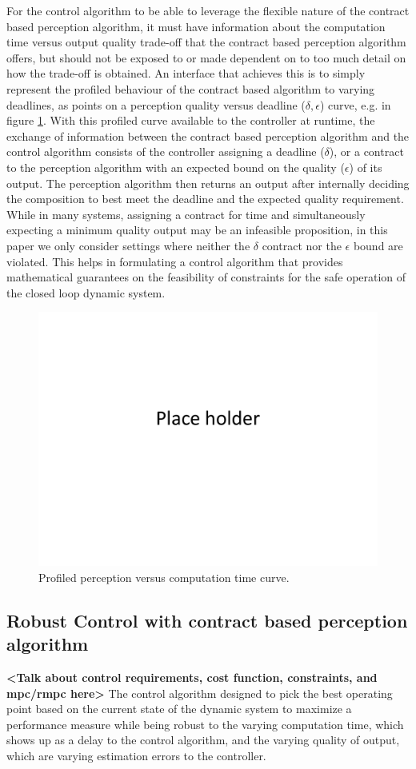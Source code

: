 For the control algorithm to be able to leverage the flexible nature of the contract based perception algorithm, it must have information about the computation time versus output quality trade-off that the contract based perception algorithm offers, but should not be exposed to or made dependent on to too much detail on how the trade-off is obtained. An interface that achieves this is to simply represent the profiled behaviour of the contract based algorithm to varying deadlines, as points on a perception quality versus deadline ($\delta, \epsilon$) curve, e.g. in figure \ref{fig:eps_delta_toy}. 
With this profiled curve available to the controller at runtime, the exchange of information between the contract based perception algorithm and the control algorithm consists of the controller assigning a deadline ($\delta$), or a contract to the perception algorithm with an expected bound on the quality ($\epsilon$) of its output. The perception algorithm then returns an output after internally deciding the composition to best meet the deadline and the expected quality requirement. While in many systems, assigning a contract for time and simultaneously expecting a minimum quality output may be an infeasible proposition, in this paper we only consider settings where neither the $\delta$ contract nor the $\epsilon$ bound are violated. This helps in formulating a control algorithm that provides mathematical guarantees on the feasibility of constraints for the safe operation of the closed loop dynamic system.

\begin{figure}[t]
	\centering
	\includegraphics[width=0.7\linewidth]{figures/placeHolder}
	\caption{Profiled perception versus computation time curve.}
	\label{fig:eps_delta_toy}
\end{figure}

\subsection{Robust Control with contract based perception algorithm}

\textbf{<Talk about control requirements, cost function, constraints, and mpc/rmpc here>}
The control algorithm designed to pick the best operating point based on the current state of the dynamic system to maximize a performance measure while being robust to the varying computation time, which shows up as a delay to the control algorithm, and the varying quality of output, which are varying estimation errors to the controller.






